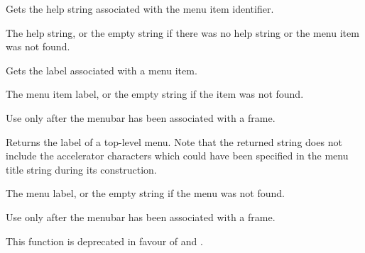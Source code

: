 Gets the help string associated with the menu item identifier.




The help string, or the empty string if there was no help string or the menu item
was not found.




\label{wxmenubargetlabel}


Gets the label associated with a menu item.




The menu item label, or the empty string if the item was not found.


Use only after the menubar has been associated with a frame.


\label{wxmenubargetlabeltop}


Returns the label of a top-level menu. Note that the returned string does not
include the accelerator characters which could have been specified in the menu
title string during its construction.




The menu label, or the empty string if the menu was not found.


Use only after the menubar has been associated with a frame.

This function is deprecated in favour of  and .




